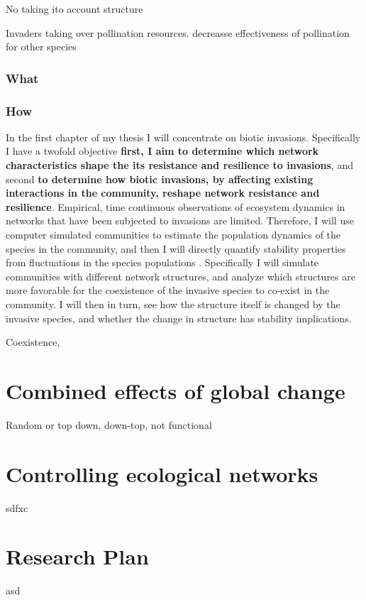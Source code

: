 \documentclass[a4paper]{report}
\begin{document}

No taking ito account structure

Invaders taking over pollination resources. decreasse effectiveness of pollination for other species


\subsection*{What}



\subsection*{How}

In the first chapter of my thesis I will concentrate on biotic invasions.
Specifically I have a twofold objective \textbf{first, I aim to determine which network characteristics shape the its resistance and resilience to invasions}, and second \textbf{to determine how biotic invasions, by affecting existing interactions in the community, reshape network resistance and resilience}.
Empirical, time continuous observations of ecosystem dynamics in networks that have been subjected to invasions are limited.
Therefore, I will use computer simulated communities to estimate the population dynamics of the species in the community, and then I will directly quantify stability properties from fluctuations in the species populations \citep{Bastolla2009, Garcia-Algarra2013}.
Specifically I will simulate communities with different network structures, and analyze which structures are more favorable for the coexistence of the invasive species to co-exist in the community.
I will then in turn, see how the structure itself is changed by the invasive species, and whether the change in structure has stability implications.

Coexistence,

\chapter*{Combined effects of global change}

Random or top down, down-top, not functional

\chapter*{Controlling ecological networks}

sdfxc

\chapter*{Research Plan}

asd

\footnotesize
\twocolumn

\end{document}
